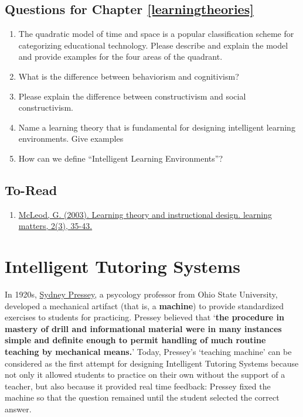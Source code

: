 \documentclass[
]{book}
\providecommand{\tightlist}{%
  \setlength{\itemsep}{0pt}\setlength{\parskip}{0pt}}
\begin{document}
\section{Questions for Chapter \ref{learningtheories}}\label{questions-for-chapter-reflearningtheories}

\begin{enumerate}
\def\labelenumi{\arabic{enumi}.}
\tightlist
\item
  The quadratic model of time and space is a popular classification scheme for categorizing educational technology. Please describe and explain the model and provide examples for the four areas of the quadrant.
\item
  What is the difference between behaviorism and cognitivism?
\item
  Please explain the difference between constructivism and social constructivism.
\item
  Name a learning theory that is fundamental for designing intelligent learning environments. Give examples
\item
  How can we define ``Intelligent Learning Environments''?
\end{enumerate}

\section{To-Read}\label{to-read}

\begin{enumerate}
\def\labelenumi{\arabic{enumi}.}
\tightlist
\item
  \href{https://eddl.tru.ca/wp-content/uploads/2021/02/McLeod_from-learningmatters02durh.pdf}{McLeod, G. (2003). Learning theory and instructional design. learning matters, 2(3), 35-43.}
\end{enumerate}

\chapter{Intelligent Tutoring Systems}\label{its}

In 1920s, \href{https://en.wikipedia.org/wiki/Sidney_L._Pressey}{Sydney Pressey}, a psycology professor from Ohio State University, developed a mechanical artifact (that is, a \textbf{machine}) to provide standardized exercises to students for practicing. Pressey believed that `\textbf{the procedure in mastery of drill and informational material were in many instances simple and definite enough to permit handling of much routine teaching by mechanical means.}' Today, Pressey's `teaching machine' can be considered as the first attempt for designing Intelligent Tutoring Systems because not only it allowed students to practice on their own without the support of a teacher, but also because it provided real time feedback: Pressey fixed the machine so that the question remained until the student selected the correct answer.
\end{document}
